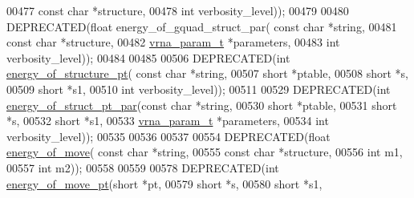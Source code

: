 \begin{DoxyCode}
00477                                 \textcolor{keyword}{const} \textcolor{keywordtype}{char} *structure,
00478                                 \textcolor{keywordtype}{int} verbosity\_level));
00479 
00480 DEPRECATED(\textcolor{keywordtype}{float} energy\_of\_gquad\_struct\_par( \textcolor{keyword}{const} \textcolor{keywordtype}{char} *\textcolor{keywordtype}{string},
00481                                   \textcolor{keyword}{const} \textcolor{keywordtype}{char} *structure,
00482                                   \hyperlink{group__energy__parameters_structvrna__param__s}{vrna\_param\_t} *parameters,
00483                                   \textcolor{keywordtype}{int} verbosity\_level));
00484 
00485 
00506 DEPRECATED(\textcolor{keywordtype}{int} \hyperlink{group__eval_ga8831445966b761417e713360791299d8}{energy\_of\_structure\_pt}( \textcolor{keyword}{const} \textcolor{keywordtype}{char} *\textcolor{keywordtype}{string},
00507                             \textcolor{keywordtype}{short} *ptable,
00508                             \textcolor{keywordtype}{short} *s,
00509                             \textcolor{keywordtype}{short} *s1,
00510                             \textcolor{keywordtype}{int} verbosity\_level));
00511 
00529 DEPRECATED(\textcolor{keywordtype}{int} \hyperlink{group__eval_ga49acb3d5627dc6823a7ce12d116d4c69}{energy\_of\_struct\_pt\_par}(\textcolor{keyword}{const} \textcolor{keywordtype}{char} *\textcolor{keywordtype}{string},
00530                             \textcolor{keywordtype}{short} *ptable,
00531                             \textcolor{keywordtype}{short} *s,
00532                             \textcolor{keywordtype}{short} *s1,
00533                             \hyperlink{group__energy__parameters_structvrna__param__s}{vrna\_param\_t} *parameters,
00534                             \textcolor{keywordtype}{int} verbosity\_level));
00535 
00536 
00537 
00554 DEPRECATED(\textcolor{keywordtype}{float} \hyperlink{group__eval_ga539ecaed89730f7644c202f304d7529b}{energy\_of\_move}( \textcolor{keyword}{const} \textcolor{keywordtype}{char} *\textcolor{keywordtype}{string},
00555                       \textcolor{keyword}{const} \textcolor{keywordtype}{char} *structure,
00556                       \textcolor{keywordtype}{int} m1,
00557                       \textcolor{keywordtype}{int} m2));
00558 
00559 
00578 DEPRECATED(\textcolor{keywordtype}{int} \hyperlink{group__eval_ga49e0ee561be69faf0568213546f6a53f}{energy\_of\_move\_pt}(\textcolor{keywordtype}{short} *pt,
00579                    \textcolor{keywordtype}{short} *s,
00580                    \textcolor{keywordtype}{short} *s1,

\end{DoxyCode}
